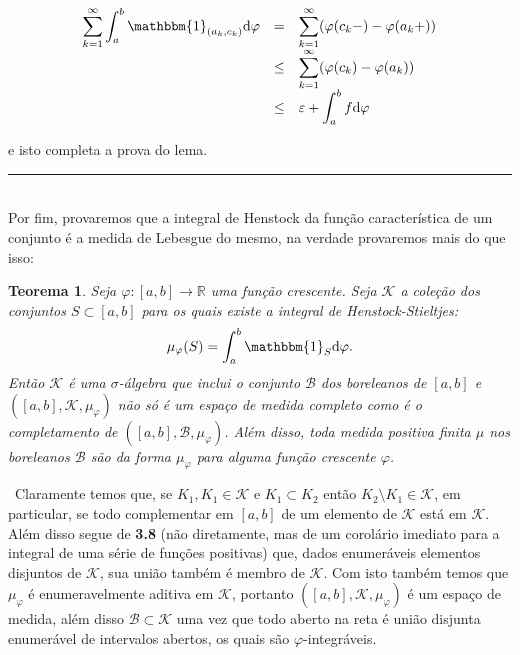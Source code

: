 \documentclass[12pt, a4paper]{article}
\newtheorem{thrm}[mydef]{Teorema}
\def\dem{\par\smallbreak\noindent {\textit{ Demonstração:}} \ }
\def\eop{\hfill\rule{2.5mm}{2.5mm}}
\theoremstyle{definition}
\begin{document}
$$\begin{array}{lll}

\displaystyle\sum_{k=1}^\infty \displaystyle\int_a^b  \mathbbm{1}_{(a_k,c_k)} \text{d}\varphi  & = &  \displaystyle\sum_{k=1}^\infty  (\varphi(c_k -)-\varphi(a_k +)) \\
\ & \leq & \displaystyle\sum_{k=1}^\infty  (\varphi(c_k)-\varphi(a_k)) \\
\ & \leq &   \varepsilon + \displaystyle\int_a^b f  \text{d}\varphi
\end{array}$$

e isto completa a prova do lema. \eop  \\

Por fim, provaremos que a integral de Henstock da função característica de um conjunto é a medida de Lebesgue do mesmo, na verdade provaremos mais do que isso:

\begin{thrm}
	
	Seja $\varphi: [a,b]\rightarrow \mathbb{R}$ uma função crescente. Seja $\mathcal{K}$ a coleção dos conjuntos $S\subset [a,b]$ para os quais existe a integral de Henstock-Stieltjes: $$\mu_\varphi (S)=\int_a^b \mathbbm{1}_S  \text{d}\varphi .$$ Então $\mathcal{K}$ é uma $\sigma$-álgebra que inclui o conjunto $\mathcal{B}$ dos boreleanos de $[a,b]$ e $([a,b],\mathcal{K},\mu_\varphi)$ não só é um espaço de medida completo como é o completamento de $([a,b],\mathcal{B},\mu_\varphi)$. Além disso, toda medida positiva finita $\mu$ nos boreleanos  $\mathcal{B}$ são da forma $\mu_\varphi$ para alguma função crescente $\varphi$.
	
	
\end{thrm}

\dem Claramente temos que, se $K_1,K_1\in \mathcal{K}$ e $K_1\subset K_2$ então $K_2\setminus K_1\in \mathcal{K}$, em particular, se todo complementar em $[a,b]$ de um elemento de $\mathcal{K}$ está em $\mathcal{K}$. Além disso segue de \textbf{3.8} (não diretamente, mas de um corolário imediato para a integral de uma série de funções positivas) que, dados enumeráveis elementos disjuntos de $\mathcal{K}$, sua união também é membro de $\mathcal{K}$. Com isto também temos que $\mu_\varphi$ é enumeravelmente aditiva em $\mathcal{K}$, portanto $([a,b],\mathcal{K},\mu_\varphi)$ é um espaço de medida, além disso $\mathcal{B}\subset \mathcal{K}$ uma vez que todo aberto na reta é união disjunta enumerável de intervalos abertos, os quais são $\varphi$-integráveis. 
\end{document}
